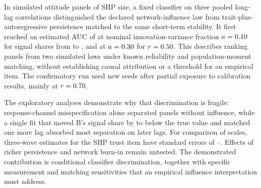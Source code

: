 In simulated attitude panels of SHP size, a fixed classifier on three pooled long-lag correlations distinguished the declared network-influence law from trait-plus-autoregressive persistence matched to the same short-term stability. It first reached an estimated AUC of  at nominal innovation-variance fraction $a=\resultnum{j.b.r055.first.point}{0.10}$ for signal shares from  to , and at $a=\resultnum{j.b.r050.first.point}{0.30}$ for $r=\resultnum{v4.tab.T1.B.r050.r}{0.50}$. This describes ranking panels from two simulated laws under known reliability and population-moment matching, without establishing causal attribution or a threshold for an empirical item. The confirmatory run used new seeds after partial exposure to calibration results, mainly at $r=\resultnum{v4.protocol.r.070}{0.70}$.

The exploratory analyses demonstrate why that discrimination is fragile: response-channel misspecification alone separated panels without influence, while a single fit that moved B's signal share by  to  below the true value and matched one more lag absorbed most separation on later lags. For comparison of scales, three-wave estimates for the SHP trust item have standard errors of --. Effects of richer persistence and network burn-in remain untested. The demonstrated contribution is conditional classifier discrimination, together with specific measurement and matching sensitivities that an empirical influence interpretation must address.
